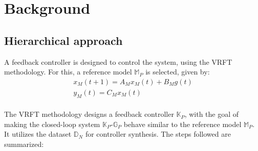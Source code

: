 \documentclass[letterpaper, 10 pt, conference]{ieeeconf}  %
\begin{document}
\section{Background}
\label{Background}
\subsection{Hierarchical approach}
A feedback controller is designed to control the system, using the VRFT methodology. For this, a reference model $\mathbb{M}_P$ is selected, given by:
	\begin{equation*}
	\begin{matrix}
	x_M(t+1) = A_Mx_M(t) + B_Mg(t)\\
	y_M(t) = C_Mx_M(t)
	\end{matrix}
	\end{equation*}\\  
 The VRFT methodology designs a feedback controller  $\mathbb{K}_P$, with the goal of making the closed-loop system $\mathbb{K}_P$-$\mathbb{G}_P$ behave similar to the reference model $\mathbb{M}_P$. It utilizes the dataset $\mathbb{D}_N$ for controller synthesis. The steps followed are summarized:
\end{document}

